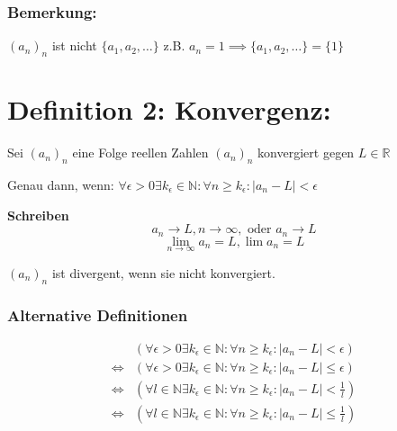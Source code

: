 \documentclass[fleqn]{scrbook}
\begin{document}
\subsubsection{Bemerkung:} $(a_n)_n$ ist nicht $\{a_1, a_2, \ldots\}$ z.B. $a_n = 1 \implies \{a_1, a_2, \ldots\} = \{1\}$

\section{Definition 2: Konvergenz:}

Sei $(a_n)_n$ eine Folge reellen Zahlen $(a_n)_n$ konvergiert gegen $L \in \mathbb{R}$

Genau dann, wenn: $\forall \epsilon > 0 \exists k_\epsilon \in \mathbb{N}: \forall n \geq k_\epsilon: |a_n - L| < \epsilon$

\textbf{Schreiben} 
\[a_n \to L, n\to \infty, \text{ oder } a_n \to L\]
\[\lim_{n \to \infty} a_n = L, \lim a_n = L\]

$(a_n)_n$ ist divergent, wenn sie nicht konvergiert.

\subsubsection{Alternative Definitionen} 

\begin{align*}
                      & \left(\forall \epsilon > 0 \exists k_\epsilon \in \mathbb{N}: \forall n \geq k_\epsilon: |a_n - L| < \epsilon \right) \\
  \Longleftrightarrow & \left(\forall \epsilon > 0 \exists k_\epsilon \in \mathbb{N}: \forall n \geq k_\epsilon: |a_n - L| \leq \epsilon \right) \\
  \Longleftrightarrow & \left(\forall l \in \mathbb{N} \exists k_\epsilon \in \mathbb{N}: \forall n \geq k_\epsilon: |a_n - L| < \frac{1}{l} \right) \\
  \Longleftrightarrow & \left(\forall l \in \mathbb{N} \exists k_\epsilon \in \mathbb{N}: \forall n \geq k_\epsilon: |a_n - L| \leq \frac{1}{l} \right) 
\end{align*}
\end{document}
